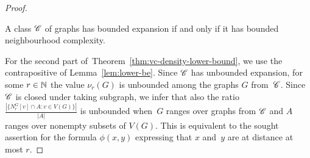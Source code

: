 \begin{proof}
\begin{lemma}\label{lem:lower-be}
A class $\mathscr{C}$ of graphs has bounded expansion if and only if 
it has bounded neighbourhood complexity.
\end{lemma}

For the second part of~Theorem~\ref{thm:vc-density-lower-bound}, we use the contrapositive of Lemma~\ref{lem:lower-be}. Since $\mathscr{C}$ has unbounded expansion, for some $r\in \mathbb{N}$ 
the value $\nu_r(G)$ is unbounded among the graphs $G$ 
from~$\mathscr{C}$.
Since $\mathscr{C}$ is closed under taking subgraph, we infer that also the ratio 
$\frac{|\{N_r^G[v]\cap A \colon v\in V(G)\}|}{|A|}$ is unbounded when~$G$ ranges over graphs from $\mathscr{C}$ and $A$ ranges over nonempty subsets of $V(G)$.
This is equivalent to the sought assertion for the formula $\phi(x,y)$ expressing that $x$ and~$y$ are at distance at most $r$. 

\mbox{}
\end{proof}

